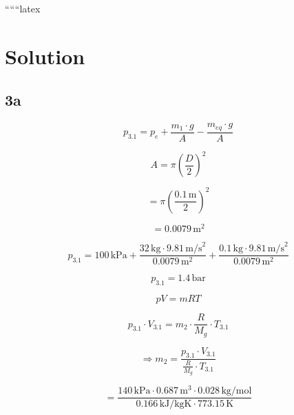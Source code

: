 
``````latex


\section*{Solution}

\subsection*{3a}

\begin{equation*}
    p_{3.1} = p_e + \frac{m_1 \cdot g}{A} - \frac{m_{eq} \cdot g}{A}
\end{equation*}

\begin{equation*}
    A = \pi \left( \frac{D}{2} \right)^2
\end{equation*}

\begin{equation*}
    = \pi \left( \frac{0.1 \, \text{m}}{2} \right)^2
\end{equation*}

\begin{equation*}
    = 0.0079 \, \text{m}^2
\end{equation*}

\begin{equation*}
    p_{3.1} = 100 \, \text{kPa} + \frac{32 \, \text{kg} \cdot 9.81 \, \text{m/s}^2}{0.0079 \, \text{m}^2} + \frac{0.1 \, \text{kg} \cdot 9.81 \, \text{m/s}^2}{0.0079 \, \text{m}^2}
\end{equation*}

\begin{equation*}
    p_{3.1} = 1.4 \, \text{bar}
\end{equation*}

\begin{equation*}
    pV = mRT
\end{equation*}

\begin{equation*}
    p_{3.1} \cdot V_{3.1} = m_2 \cdot \frac{R}{M_g} \cdot T_{3.1}
\end{equation*}

\begin{equation*}
    \Rightarrow m_2 = \frac{p_{3.1} \cdot V_{3.1}}{\frac{R}{M_g} \cdot T_{3.1}}
\end{equation*}

\begin{equation*}
    = \frac{140 \, \text{kPa} \cdot 0.687 \, \text{m}^3 \cdot 0.028 \, \text{kg/mol}}{0.166 \, \text{kJ/kgK} \cdot 773.15 \, \text{K}}
\end{equation*}

